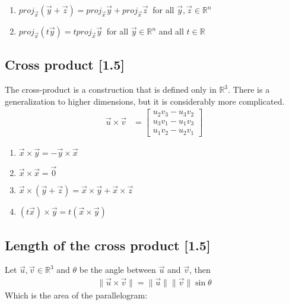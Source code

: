 \documentclass[a4paper,9pt]{extarticle}
\begin{document}
\begin{multicols*}{2}
\begin{enumerate}[label=\bfseries (\arabic*)] \itemsep0pt \parskip0pt 
    \item $proj_{\vec{x}} (\vec{y} + \vec{z}) = proj_{\vec{x}} \vec{y} + proj_{\vec{x}} \vec{z} \>$ for all $\vec{y}, \vec{z} \in \mathbb{R}^n$
    \item $proj_{\vec{x}} (t \vec{y}) = t proj_{\vec{x}} \vec{y} \>$ for all $\vec{y} \in \mathbb{R}^n$ and all $t \in \mathbb{R}$
\end{enumerate}


\subsection{Cross product [1.5]}
The cross-product is a construction that is defined only in $\mathbb{R}^3$. There is a generalization to higher dimensions, but it is considerably more complicated.
\begin{equation} \label{1.5-1}
    \begin{split}
        \vec{u} \times \vec{v} & = \begin{bmatrix}u_2 v_3 - u_3 v_2 \\ u_3 v_1 - u_1 v_3 \\ u_1 v_2 - u_2 v_1 \end{bmatrix}
    \end{split}
\end{equation}

\begin{enumerate}[label=\bfseries (\arabic*)] \itemsep0pt \parskip0pt 
    \item $\vec{x} \times \vec{y} = -\vec{y} \times \vec{x}$
    \item $\vec{x} \times \vec{x} = \vec{0}$
    \item $\vec{x} \times (\vec{y} + \vec{z}) = \vec{x} \times \vec{y} + \vec{x} \times \vec{z}$
    \item $(t \vec{x}) \times \vec{y} = t(\vec{x} \times \vec{y})$
\end{enumerate}


\subsection{Length of the cross product [1.5]}
Let $\vec{u}, \vec{v} \in \mathbb{R}^3$ and $\theta$ be the angle between $\vec{u}$ and $\vec{v}$, then
\begin{equation} \label{1.5-2}
    \begin{split}
        \|\vec{u} \times \vec{v}\| = \|\vec{u}\| \|\vec{v}\| \sin{\theta}
    \end{split}
\end{equation}
Which is the area of the parallelogram:


\end{multicols*}
\end{document}
